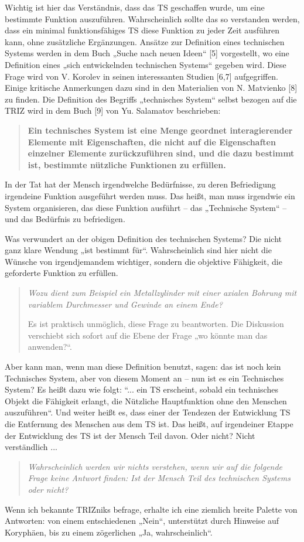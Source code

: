 \documentclass[11pt,a4paper]{article}
\begin{document}
Wichtig ist hier das Verständnis, dass das TS geschaffen wurde, um eine
bestimmte Funktion auszuführen. Wahrscheinlich sollte das so verstanden
werden, dass ein minimal funktionsfähiges TS diese Funktion zu jeder Zeit
ausführen kann, ohne zusätzliche Ergänzungen. Ansätze zur Definition eines
technischen Systems werden in dem Buch „Suche nach neuen Ideen“ [5]
vorgestellt, wo eine Definition eines „sich entwickelnden technischen Systems“
gegeben wird. Diese Frage wird von V. Korolev in seinen interessanten Studien
[6,7] aufgegriffen. Einige kritische Anmerkungen dazu sind in den Materialien
von N. Matvienko [8] zu finden. Die Definition des Begriffs „technisches
System“ selbst bezogen auf die TRIZ wird in dem Buch [9] von Yu. Salamatov
beschrieben: 
\begin{quote}\bf
  Ein technisches System ist eine Menge geordnet interagierender Elemente mit
  Eigenschaften, die nicht auf die Eigenschaften einzelner Elemente
  zurückzuführen sind, und die dazu bestimmt ist, bestimmte nützliche
  Funktionen zu erfüllen. 
\end{quote}
In der Tat hat der Mensch irgendwelche Bedürfnisse, zu deren Befriedigung
irgendeine Funktion ausgeführt werden muss. Das heißt, man muss irgendwie ein
System organisieren, das diese Funktion ausführt -- das „Technische System“ --
und das Bedürfnis zu befriedigen.

Was verwundert an der obigen Definition des technischen Systems? Die nicht
ganz klare Wendung „ist bestimmt für“. Wahrscheinlich sind hier nicht die
Wünsche von irgendjemandem wichtiger, sondern die objektive Fähigkeit, die
geforderte Funktion zu erfüllen.  
\begin{quote}\it
  Wozu dient zum Beispiel ein Metallzylinder mit einer axialen Bohrung mit
  variablem Durchmesser und Gewinde an einem Ende?

  Es ist praktisch unmöglich, diese Frage zu beantworten. Die Diskussion
  verschiebt sich sofort auf die Ebene der Frage „wo könnte man das
  anwenden?“.
\end{quote}
Aber kann man, wenn man diese Definition benutzt, sagen: das ist noch kein
Technisches System, aber von diesem Moment an -- nun ist es ein Technisches
System? Es heißt dazu wie folgt: “... ein TS erscheint, sobald ein technisches
Objekt die Fähigkeit erlangt, die Nützliche Hauptfunktion ohne den Menschen
auszuführen“. Und weiter heißt es, dass einer der Tendezen der Entwicklung TS
die Entfernung des Menschen aus dem TS ist. Das heißt, auf irgendeiner Etappe
der Entwicklung des TS ist der Mensch Teil davon. Oder nicht?
Nicht verständlich ...  
\begin{quote}\it
  Wahrscheinlich werden wir nichts verstehen, wenn wir auf die folgende Frage
  keine Antwort finden: Ist der Mensch Teil des technischen Systems oder
  nicht?
\end{quote}
Wenn ich bekannte TRIZniks befrage, erhalte ich eine ziemlich breite Palette
von Antworten: von einem entschiedenen „Nein“, unterstützt durch Hinweise auf
Koryphäen, bis zu einem zögerlichen „Ja, wahrscheinlich“.
\end{document}
